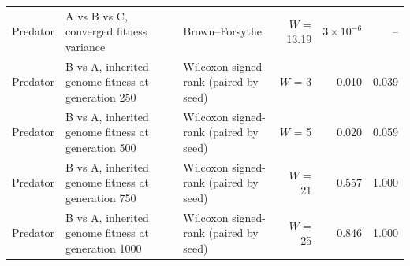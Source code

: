 \begin{table}[t]
\begin{tabular}{@{}lllrrr@{}}
    Predator & A vs B vs C, converged fitness variance & Brown--Forsythe & $W$ = 13.19 & $3{\times}10^{-6}$ & -- \\
    Predator & B vs A, inherited genome fitness at generation 250 & Wilcoxon signed-rank (paired by seed) & $W$ = 3 & 0.010 & 0.039 \\
    Predator & B vs A, inherited genome fitness at generation 500 & Wilcoxon signed-rank (paired by seed) & $W$ = 5 & 0.020 & 0.059 \\
    Predator & B vs A, inherited genome fitness at generation 750 & Wilcoxon signed-rank (paired by seed) & $W$ = 21 & 0.557 & 1.000 \\
    Predator & B vs A, inherited genome fitness at generation 1000 & Wilcoxon signed-rank (paired by seed) & $W$ = 25 & 0.846 & 1.000 \\
    \bottomrule
  \end{tabular}
\end{table}

